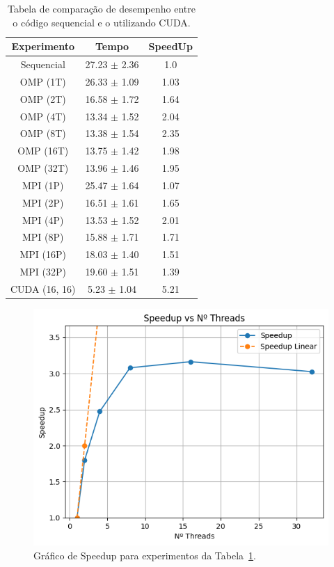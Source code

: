\documentclass[12pt]{article}
\begin{document}
\begin{table}[ht]
  \centering
  \caption{Tabela de comparação de desempenho entre o código sequencial e o
    utilizando CUDA.}\label{tab:Resultados}
  \vspace{0.3cm}
  \begin{tabular}{||c c c||}
    \hline
    Experimento   & Tempo            & SpeedUp \\ [0.5ex]
    \hline\hline
    Sequencial    & 27.23 $\pm$ 2.36 & 1.0     \\
    \hline
    OMP (1T)      & 26.33 $\pm$ 1.09 & 1.03    \\
    \hline
    OMP (2T)      & 16.58 $\pm$ 1.72 & 1.64    \\
    \hline
    OMP (4T)      & 13.34 $\pm$ 1.52 & 2.04    \\
    \hline
    OMP (8T)      & 13.38 $\pm$ 1.54 & 2.35    \\
    \hline
    OMP (16T)     & 13.75 $\pm$ 1.42 & 1.98    \\
    \hline
    OMP (32T)     & 13.96 $\pm$ 1.46 & 1.95    \\
    \hline
    MPI (1P)      & 25.47 $\pm$ 1.64 & 1.07    \\
    \hline
    MPI (2P)      & 16.51 $\pm$ 1.61 & 1.65    \\
    \hline
    MPI (4P)      & 13.53 $\pm$ 1.52 & 2.01    \\
    \hline
    MPI (8P)      & 15.88 $\pm$ 1.71 & 1.71    \\
    \hline
    MPI (16P)     & 18.03 $\pm$ 1.40 & 1.51    \\
    \hline
    MPI (32P)     & 19.60 $\pm$ 1.51 & 1.39    \\
    \hline
    CUDA (16, 16) & 5.23 $\pm$ 1.04  & 5.21    \\
    \hline
  \end{tabular}
\end{table}

\begin{figure}[ht]
  \centering
  \includegraphics[width=.9\textwidth]{figs/speedupxthreads.png}
  \caption{Gráfico de Speedup para experimentos da Tabela~\ref{tab:Resultados}.}\label{fig:speedupxthread}
\end{figure}
\end{document}
